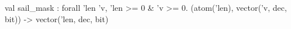 val sail_mask : forall 'len 'v, 'len >= 0 & 'v >= 0. (atom('len), vector('v, dec, bit)) -> vector('len, dec, bit)
